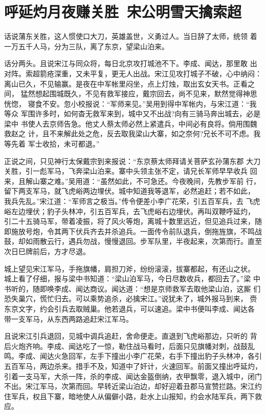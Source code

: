 \chapter{呼延灼月夜赚关胜~宋公明雪天擒索超}

话说蒲东关胜，这人惯使口大刀，英雄盖世，义勇过人。当日辞了太师，统领
着一万五千人马，分为三队，离了东京，望梁山泊来。

话分两头。且说宋江与同众将，每日北京攻打城池不下。李成、闻达，那里敢
出对阵。索超箭疮深重，又未平复，更无人出战。宋江见攻打城子不破，心中纳闷：
离山已久，不见输赢。是夜在中军帐里闷坐，点上灯烛，取出玄女天书。正看之间，
猛然想起围城既久，不见有救军接应，戴宗回去，尚不见来，默然觉得神思恍惚，
寝食不安。忽小校报说：“军师来见。”吴用到得中军帐内，与宋江道：“我等众
军围许多时，如何杳无救军来到，城中又不出战?向有三骑马奔出城去，必是梁中
书使人去京师告急。他丈人蔡太师必然上紧遣兵，中间必有良将。倘用围魏救赵之
计，且不来解此处之危，反去取我梁山大寨，如之奈何?兄长不可不虑。我等先着
军士收拾，未可都退。”

正说之间，只见神行太保戴宗到来报说：“东京蔡太师拜请关菩萨玄孙蒲东郡
大刀关胜，引一彪军马，飞奔梁山泊来。寨中头领主张不定，请兄长军师早早收兵
回来，且解山寨之难。”吴用道：“虽然如此，不可急还。今夜晚间，先教步军前
行，留下两支军马，就飞虎峪两边埋伏。城中知道我等退军，必然追赶；若不如此，
我兵先乱。”宋江道：“军师言之极当。”传令便差小李广花荣，引五百军兵，去
飞虎峪左边埋伏；豹子头林冲，引五百军兵，去飞虎峪右边埋伏。再叫双鞭呼延灼，
引二十五骑马军，带着凌振，将了风火等炮，离城十数里远近，但见追兵过来，随
即施放号炮，令其两下伏兵齐去并杀追兵。一面传令前队退兵，倒拖旌旗，不鸣战
鼓，却如雨散云行，遇兵勿战，慢慢退回。步军队里，半夜起来，次第而行。直至
次日巳牌前后，方才尽退。

城上望见宋江军马，手拖旗幡，肩担刀斧，纷纷滚滚，拔寨都起，有还山之状。
城上看了仔细，报与梁中书知道：“梁山泊军马，今日尽数收兵，都回去了。”梁
中书听的，随即唤李成、闻达商议。闻达道：“想是京师救军去取他梁山泊，这厮
们恐失巢穴，慌忙归去。可以乘势追杀，必擒宋江。”说犹未了，城外报马到来，
赍东京文字，约会引兵去取贼巢。他若退兵，可以速追。梁中书便叫李成、闻达各
带一支军马，从东西两路追赶宋江军马。

且说宋江引兵退回，见城中调兵追赶，舍命便走。直退到飞虎峪那边，只听的
背后火炮齐响。李成、闻达吃了一惊，勒住战马看时，后面只见旗幡对刺，战鼓乱
鸣。李成、闻达火急回军，左手下撞出小李广花荣，右手下撞出豹子头林冲，各引
五百军马，两边杀来。措手不及，知道中了奸计，火速回军。前面又撞出呼延灼，
引着一支马军，大杀一阵，杀的李成、闻达金盔倒纳，衣甲飘零，退入城中，闭门
不出。宋江军马，次第而回。早转近梁山泊边，却好迎着丑郡马宣赞拦路。宋江约
住军兵，权且下寨，暗地使人从偏僻小路，赴水上山报知，约会水陆军兵，两下救
应。

